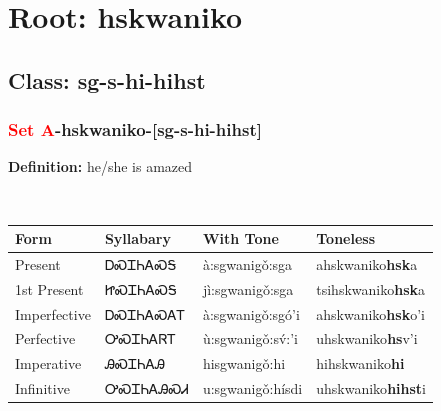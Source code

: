 \needspace{4in}
\section*{Root: hskwaniko}
\nopagebreak
{}
\needspace{3in}
\subsection*{Class: sg-s-hi-hihst}
\nopagebreak
\needspace{2in}
\subsubsection*{\textcolor{Red}{Set A}{-}\textbf{hskwaniko}{-}[sg-s-hi-hihst]}
\nopagebreak
\textbf{Definition: } he/she is amazed
\\[0.5em]
\begin{tabularx}{\textwidth}{l X X X}%
\toprule%
\textbf{Form}&\textbf{Syllabary}&\textbf{With Tone}&\textbf{Toneless}\\%
\midrule%
Present&ᎠᏍᏆᏂᎪᏍᎦ&à:sgwanigǒ:sga&ahskwaniko\textbf{hsk}a\\%
1st Present&ᏥᏍᏆᏂᎪᏍᎦ&jì:sgwanigǒ:sga&tsihskwaniko\textbf{hsk}a\\%
Imperfective&ᎠᏍᏆᏂᎪᏍᎪᎢ&à:sgwanigǒ:sgó’i&ahskwaniko\textbf{hsk}o'i\\%
Perfective&ᎤᏍᏆᏂᎪᏒᎢ&ù:sgwanigǒ:sv́:’i&uhskwaniko\textbf{hs}v'i\\%
Imperative&ᎯᏍᏆᏂᎪᎯ&hisgwanigǒ:hi&hihskwaniko\textbf{hi}\\%
Infinitive&ᎤᏍᏆᏂᎪᎯᏍᏗ&u:sgwanigǒ:hísdi&uhskwaniko\textbf{hihst}i\\%
\bottomrule%
\end{tabularx}
\\[1em]